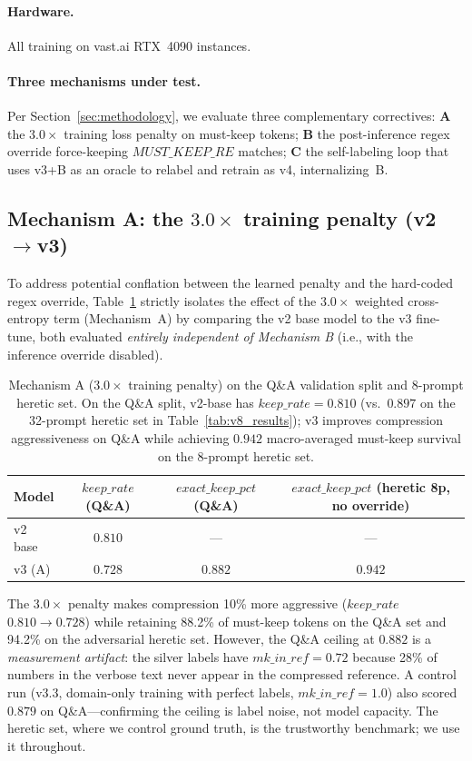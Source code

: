 \paragraph{Hardware.} All training on vast.ai RTX~4090 instances.

\paragraph{Three mechanisms under test.} Per
Section~\ref{sec:methodology}, we evaluate three complementary correctives:
\textbf{A} the $3.0\times$ training loss penalty on must-keep tokens;
\textbf{B} the post-inference regex override force-keeping
$\mathit{MUST\_KEEP\_RE}$ matches; \textbf{C} the self-labeling loop that uses
v3+B as an oracle to relabel and retrain as v4, internalizing~B.

\subsection{Mechanism A: the $3.0\times$ training penalty (v2$\to$v3)}
\label{sec:eval:A}

To address potential conflation between the learned penalty and the hard-coded
regex override, Table~\ref{tab:v2v3} strictly isolates the effect of the $3.0\times$ weighted
cross-entropy term (Mechanism~A) by comparing the v2 base model to the v3
fine-tune, both evaluated \emph{entirely independent of Mechanism B} (i.e., with
the inference override disabled).

\begin{table}[h]
\centering
\caption{Mechanism A ($3.0\times$ training penalty) on the Q\&A validation split
and 8-prompt heretic set. On the Q\&A split, v2-base has $\mathit{keep\_rate}{=}0.810$
(vs.\ $0.897$ on the 32-prompt heretic set in Table~\ref{tab:v8_results}); v3
improves compression aggressiveness on Q\&A while achieving $0.942$ macro-averaged
must-keep survival on the 8-prompt heretic set.}
\label{tab:v2v3}
\begin{tabular}{lccc}
\toprule
Model & $\mathit{keep\_rate}$ (Q\&A) & $\mathit{exact\_keep\_pct}$ (Q\&A) & $\mathit{exact\_keep\_pct}$ (heretic 8p, no override) \\
\midrule
v2 base & $0.810$ & --- & --- \\
v3 (A)  & $0.728$ & $0.882$ & $0.942$ \\
\bottomrule
\end{tabular}
\end{table}

The $3.0\times$ penalty makes compression 10\% more aggressive
($\mathit{keep\_rate}$ $0.810\to0.728$) while retaining 88.2\% of must-keep
tokens on the Q\&A set and 94.2\% on the adversarial heretic set. However,
the Q\&A ceiling at $0.882$ is a \emph{measurement artifact}: the silver
labels have $\mathit{mk\_in\_ref}=0.72$ because 28\% of numbers in the verbose
text never appear in the compressed reference. A control run (v3.3,
domain-only training with perfect labels, $\mathit{mk\_in\_ref}=1.0$) also
scored $0.879$ on Q\&A---confirming the ceiling is label noise, not model
capacity. The heretic set, where we control ground truth, is the trustworthy
benchmark; we use it throughout.

